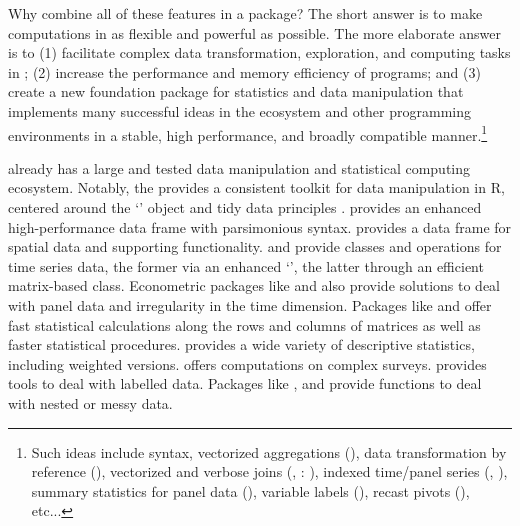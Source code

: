 \documentclass[nojss]{jss} %
\newcommand{\class}[1]{`\code{#1}'}
\begin{document}
Why combine all of these features in a package? The short answer is to make computations in  as flexible and powerful as possible. The more elaborate answer is to (1) facilitate complex data transformation, exploration, and computing tasks in ; (2) increase the performance and memory efficiency of  programs; %
and (3) create a new foundation package for statistics and data manipulation that implements many successful ideas in the  ecosystem and other programming environments in a stable, high performance, and broadly compatible manner.\footnote{Such ideas include  syntax, vectorized aggregations (), data transformation by reference (), vectorized and verbose joins (, : \citet{STATA}), indexed time/panel series (, ), summary statistics for panel data (), variable labels (), recast pivots (), etc...} \newline

 already has a large and tested data manipulation and statistical computing ecosystem. Notably, the  \citep{rtidyverse} provides a consistent toolkit for data manipulation in R, centered around the \class{tibble} \citep{rtibble} object and tidy data principles \citep{rtidydata}.  \citep{rdatatable} provides an enhanced high-performance data frame with parsimonious syntax.  \citep{rsf} provides a data frame for spatial data and supporting functionality.  \citep{rtsibble} and  \citep{rxts} provide classes and operations for time series data, the former via an enhanced \class{tibble}, the latter through an efficient matrix-based class. Econometric packages like  \citep{rplm} and  \citep{rfixest} also provide solutions to deal with panel data and irregularity in the time dimension. Packages like  \citep{rmatrixstats} and  \citep{rfast} offer fast statistical calculations along the rows and columns of matrices as well as faster statistical procedures.  \citep{rdesctools} provides a wide variety of descriptive statistics, including weighted versions.  \citep{rsurvey} offers computations on complex surveys.  \citep{rlabelled} provides tools to deal with labelled data. Packages like  \citep{rtidyr},  \citep{rpurrr} and  \citep{rrapply} provide functions to deal with nested or messy data. \newline
\end{document}
